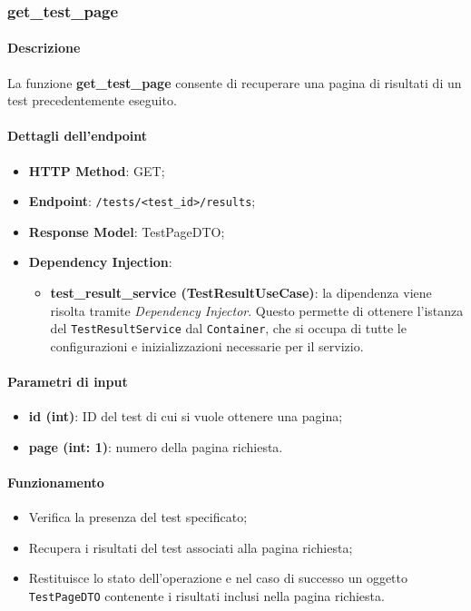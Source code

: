 \subsubsection{get\_test\_page}
\label{subsubsec:get_test_page}

\paragraph{Descrizione}
La funzione \textbf{get\_test\_page} consente di recuperare una pagina di risultati di un test precedentemente eseguito.

\paragraph{Dettagli dell'endpoint}
\begin{itemize}
    \item \textbf{HTTP Method}: GET;
    \item \textbf{Endpoint}: \texttt{/tests/<test\_id>/results};
    \item \textbf{Response Model}: TestPageDTO;
    \item \textbf{Dependency Injection}: 
    \begin{itemize}
        \item \textbf{test\_result\_service (TestResultUseCase)}: la dipendenza viene risolta tramite \textit{Dependency Injector}. Questo permette di ottenere l'istanza del \texttt{TestResultService} dal \texttt{Container}, che si occupa di tutte le configurazioni e inizializzazioni necessarie per il servizio.
    \end{itemize}
\end{itemize}

\paragraph{Parametri di input}
\begin{itemize}
    \item \textbf{id (int)}: ID del test di cui si vuole ottenere una pagina;
    \item \textbf{page (int: 1)}: numero della pagina richiesta.
\end{itemize}

\paragraph{Funzionamento}
\begin{itemize}
    \item Verifica la presenza del test specificato;
    \item Recupera i risultati del test associati alla pagina richiesta;
    \item Restituisce lo stato dell'operazione e nel caso di successo un oggetto \texttt{TestPageDTO} contenente i risultati inclusi nella pagina richiesta.
\end{itemize}

